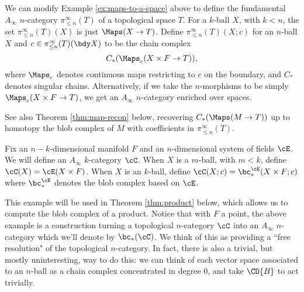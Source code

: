 



\begin{example}
\rm
\label{ex:chains-of-maps-to-a-space}
We can modify Example \ref{ex:maps-to-a-space} above to define the fundamental $A_\infty$ $n$-category $\pi^\infty_{\le n}(T)$ of a topological space $T$.
For a $k$-ball $X$, with $k < n$, the set $\pi^\infty_{\leq n}(T)(X)$ is just $\Maps(X \to T)$.
Define $\pi^\infty_{\leq n}(T)(X; c)$ for an $n$-ball $X$ and $c \in \pi^\infty_{\leq n}(T)(\bdy X)$ to be the chain complex
\[
	C_*(\Maps_c(X\times F \to T)),
\]
where $\Maps_c$ denotes continuous maps restricting to $c$ on the boundary,
and $C_*$ denotes singular chains.
Alternatively, if we take the $n$-morphisms to be simply $\Maps_c(X\times F \to T)$, 
we get an $A_\infty$ $n$-category enriched over spaces.
\end{example}

See also Theorem \ref{thm:map-recon} below, recovering $C_*(\Maps(M \to T))$ up to 
homotopy the blob complex of $M$ with coefficients in $\pi^\infty_{\le n}(T)$.

\begin{example}
\rm
\label{ex:blob-complexes-of-balls}
Fix an $n{-}k$-dimensional manifold $F$ and an $n$-dimensional system of fields $\cE$.
We will define an $A_\infty$ $k$-category $\cC$.
When $X$ is a $m$-ball, with $m<k$, define $\cC(X) = \cE(X\times F)$.
When $X$ is an $k$-ball,
define $\cC(X; c) = \bc^\cE_*(X\times F; c)$
where $\bc^\cE_*$ denotes the blob complex based on $\cE$.
\end{example}

This example will be used in Theorem \ref{thm:product} below, which allows us to compute the blob complex of a product.
Notice that with $F$ a point, the above example is a construction turning a topological 
$n$-category $\cC$ into an $A_\infty$ $n$-category which we'll denote by $\bc_*(\cC)$.
We think of this as providing a ``free resolution" 
of the topological $n$-category. 
In fact, there is also a trivial, but mostly uninteresting, way to do this: 
we can think of each vector space associated to an $n$-ball as a chain complex concentrated in degree $0$, 
and take $\CD{B}$ to act trivially. 

